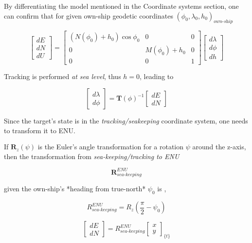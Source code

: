 By differentiating the model mentioned in the Coordinate systems section, one can confirm that for given own-ship geodetic coordinates $(\phi_0,\lambda_0, h_0)_{\textit{own-ship}}$



\begin{equation}
\begin{bmatrix}
dE\\dN\\dU
\end{bmatrix}=
\begin{bmatrix}
(N(\phi_0)+h_0)\cos\phi_0 &0 &0\\
0 &M(\phi_0) + h_0 &0\\
0 &0 &1
\end{bmatrix}
\begin{bmatrix}
d\lambda\\d\phi\\dh
\end{bmatrix}
\end{equation}


Tracking is performed \emph{at sea level}, thus $h=0$, leading to


\begin{equation}
\begin{bmatrix}
d\lambda\\ d\phi
\end{bmatrix}=
\mathbf{T}(\phi)^{-1}
\begin{bmatrix}
dE\\ dN
\end{bmatrix}
\end{equation}



Since the target's state is in the \emph{tracking/seakeeping} coordinate system, one needs to transform it to ENU.

If $\mathbf{R}_z(\psi)$ is the Euler's angle transformation for a rotation $\psi$ around the z-axis, then the transformation from \emph{sea-keeping/tracking to ENU}

$$\mathbf{R}^{\textit{ENU}}_{\textit{sea-keeping}} $$

given the own-ship's *heading from true-north* $\psi_{\textit{0}}$
is ,


\begin{equation}
R_{\textit{sea-keeping}}^{\textit{ENU}} = R_{z}(\frac{\pi}{2}-\psi_{\textit{0}})
\end{equation}


\begin{equation}
\begin{bmatrix}
dE\\ dN
\end{bmatrix}=
R_{\textit{sea-keeping}}^{\textit{ENU}}
\begin{bmatrix}
x\\ y
\end{bmatrix}_{\textit{\{t\}}}
\end{equation}


